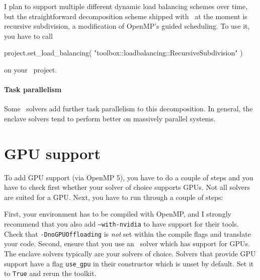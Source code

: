 I plan to support multiple different dynamic load balancing schemes over time,
but the straightforward decomposition scheme shipped with \Peano\ at the moment
is recursive subdivision, a modification of OpenMP's guided scheduling.
To use it, you have to call
\begin{code}
project.set_load_balancing( "toolbox::loadbalancing::RecursiveSubdivision" )
\end{code}

\noindent
on your \ExaHyPE\ project. 


\paragraph{Task parallelism}

Some \ExaHyPE\ solvers add further task parallelism to this decomposition. 
In general, the enclave solvers tend to perform better on massively parallel
systems.


% 


\section{GPU support}

To add GPU support (via OpenMP 5), you have to do a couple of steps
and you have to check first whether your solver of choice supports
GPUs. 
Not all solvers are suited for a GPU.
Next, you have to run through a couple of steps:


First, your environment has to be compiled with OpenMP, and I strongly recommend
that you also add \texttt{--with-nvidia} to have support for their tools.
Check that \texttt{-DnoGPUOffloading} is \emph{not} set within the compile
flags and translate your code.
Second, ensure that you use an \ExaHyPE\ solver which has support for GPUs. 
The enclave solvers typically are your solvers of choice.
Solvers that provide GPU support have a flag \texttt{use\_gpu} in their
constructor which is unset by default. 
Set it to \texttt{True} and rerun the toolkit.

